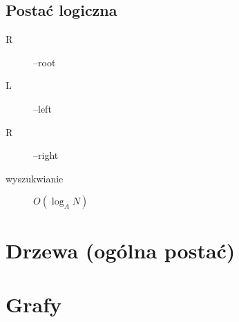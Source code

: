 \documentclass[11pt]{article}
\begin{document}
\subsection{Postać logiczna}
\label{sec:org0deca6a}
\begin{description}
\item[{R}] --root
\item[{L}] --left
\item[{R}] --right
\item[{wyszukwianie}] \(O(\log_{A}N)\)
\end{description}
\section{Drzewa (ogólna postać)}
\label{sec:org9c59ad6}
\section{Grafy}
\label{sec:org5b722c3}
\end{document}
